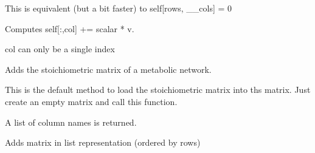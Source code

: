 \documentclass[letterpaper,12pt,english]{sphinxmanual}
\begin{document}
\begin{fulllineitems}
\begin{fulllineitems}
\sphinxAtStartPar
This is equivalent (but a bit faster) to self{[}rows, \_\_cols{]} = 0

\end{fulllineitems}


\begin{fulllineitems}
\label{\detokenize{api/modules:cbmpy.fluxmodules.sparserationals.Matrix.coladd}}
\pysigstartsignatures
\pysiglinewithargsret
{}
{\sphinxparamcomma {}\sphinxparamcomma {}}
{}
\pysigstopsignatures
\sphinxAtStartPar
Computes self{[}:,col{]} += scalar * v.

\sphinxAtStartPar
col can only be a single index

\end{fulllineitems}


\begin{fulllineitems}
\label{\detokenize{api/modules:cbmpy.fluxmodules.sparserationals.Matrix.addMetabolicNetwork}}
\pysigstartsignatures
\pysiglinewithargsret
{}
{}
{}
\pysigstopsignatures
\sphinxAtStartPar
Adds the stoichiometric matrix of a metabolic network.

\sphinxAtStartPar
This is the default method to load the stoichiometric matrix into ths matrix.
Just create an empty matrix and call this function.

\sphinxAtStartPar
A list of column names is returned.

\end{fulllineitems}


\begin{fulllineitems}
\label{\detokenize{api/modules:cbmpy.fluxmodules.sparserationals.Matrix.addListRep}}
\pysigstartsignatures
\pysiglinewithargsret
{}
{}
{}
\pysigstopsignatures
\sphinxAtStartPar
Adds matrix in list representation (ordered by rows)


\end{fulllineitems}
\end{fulllineitems}
\end{document}

